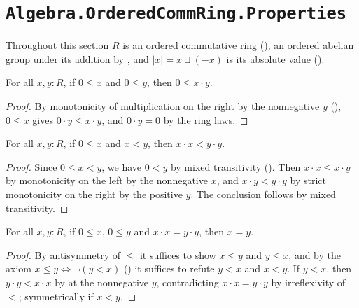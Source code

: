 \section{\texttt{Algebra.OrderedCommRing.Properties}}

Throughout this section $R$ is an ordered commutative ring (), an ordered abelian group under its addition by , and $\lvert x \rvert = x \sqcup (-x)$ is its absolute value ().

\begin{lemma}[\agda{0≤·}]
  \label{mulNonNeg}
  For all $x, y : R$, if $0 \le x$ and $0 \le y$, then $0 \le x \cdot y$.
\end{lemma}
\begin{proof}
  By monotonicity of multiplication on the right by the nonnegative $y$ (), $0 \le x$ gives $0 \cdot y \le x \cdot y$, and $0 \cdot y = 0$ by the ring laws.
\end{proof}

\begin{lemma}[\agda{0≤→<→²<²}]
  \label{sqMonoLt}
  For all $x, y : R$, if $0 \le x$ and $x < y$, then $x \cdot x < y \cdot y$.
\end{lemma}
\begin{proof}
  Since $0 \le x < y$, we have $0 < y$ by mixed transitivity (). Then $x \cdot x \le x \cdot y$ by monotonicity on the left by the nonnegative $x$, and $x \cdot y < y \cdot y$ by strict monotonicity on the right by the positive $y$. The conclusion follows by mixed transitivity.
\end{proof}

\begin{lemma}[\agda{0≤→0≤→²≡²→≡}]
  \label{sqInj}
  For all $x, y : R$, if $0 \le x$, $0 \le y$ and $x \cdot x = y \cdot y$, then $x = y$.
\end{lemma}
\begin{proof}
  By antisymmetry of $\le$ it suffices to show $x \le y$ and $y \le x$, and by the axiom $x \le y \Leftrightarrow \neg(y < x)$ () it suffices to refute $y < x$ and $x < y$. If $y < x$, then $y \cdot y < x \cdot x$ by  at the nonnegative $y$, contradicting $x \cdot x = y \cdot y$ by irreflexivity of $<$; symmetrically if $x < y$.
\end{proof}

